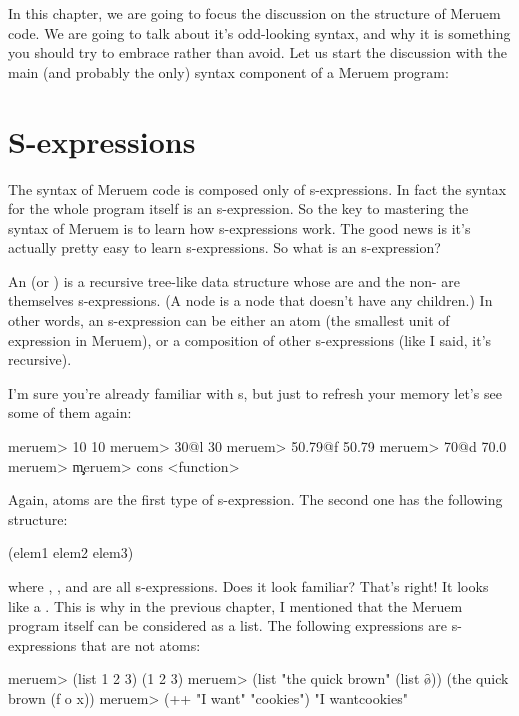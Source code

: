 In this chapter, we are going to focus the discussion on the structure of Meruem code. We are going to talk about it's odd-looking syntax, and why it is something you should try to embrace rather than avoid. Let us start the discussion with the main (and probably the only) syntax component of a Meruem program: 

\section{S-expressions}
The syntax of Meruem code is composed only of s-expressions. In fact the syntax for the whole program itself is an s-expression. So the key to mastering the syntax of Meruem is to learn how s-expressions work. The good news is it's actually pretty easy to learn s-expressions. So what is an s-expression?

An  (or ) is a recursive tree-like data structure whose  are  and the non- are themselves s-expressions. 
(A  node is a node that doesn't have any children.) In other words, an s-expression can be either an atom (the smallest unit of expression in Meruem), or a composition of other s-expressions (like I said, it's recursive). 

I'm sure you're already familiar with s, but just to refresh your memory let's see some of them again:

\begin{REPL}
meruem> 10            
10
meruem> 30@l
30
meruem> 50.79@f
50.79
meruem> 70@d
70.0
meruem> \c
\c
meruem> cons
<function>
\end{REPL}

Again, atoms are the first type of s-expression. The second one has the following structure: 

\begin{QuasiLang}
(elem1 elem2 elem3)
\end{QuasiLang}

where , , and  are all s-expressions. Does it look familiar? That's right! It looks like a . This is why in the previous chapter, I mentioned that the Meruem program itself can be considered as a list. The following expressions are s-expressions that are not atoms:

\begin{REPL}
meruem> (list 1 2 3)
(1 2 3)
meruem> (list "the quick brown" (list \f \o \x))
(the quick brown (f o x))
meruem> (++ "I want" "cookies")
"I wantcookies"
\end{REPL}

